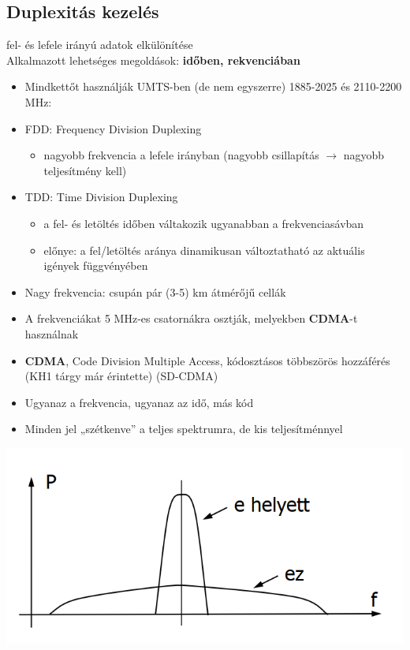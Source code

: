 \documentclass[10pt,a4paper]{article}
\begin{document}
\subsection{Duplexitás kezelés}
fel- és lefele irányú adatok elkülönítése\\
Alkalmazott lehetséges megoldások: \textbf{időben, rekvenciában}
\begin{itemize}
	\item  Mindkettőt használják UMTS-ben (de nem egyszerre) 1885-2025 és 2110-2200 MHz:
	\item FDD: Frequency Division Duplexing
	\begin{itemize}
	\item nagyobb frekvencia a lefele irányban (nagyobb csillapítás $\rightarrow$
	nagyobb teljesítmény kell)
	\end{itemize}
	\item  TDD: Time Division Duplexing
	\begin{itemize}
	\item a fel- és letöltés időben váltakozik ugyanabban a frekvenciasávban
	\item előnye: a fel/letöltés aránya dinamikusan változtatható az aktuális
	igények függvényében
	\end{itemize}
\item Nagy frekvencia: csupán pár (3-5) km átmérőjű cellák
\item  A frekvenciákat 5 MHz-es csatornákra osztják, melyekben \textbf{CDMA}-t
használnak
\item \textbf{CDMA}, Code Division Multiple Access, kódosztásos többszörös
hozzáférés (KH1 tárgy már érintette) (SD-CDMA)
\item Ugyanaz a frekvencia, ugyanaz az idő, más kód
\item Minden jel „szétkenve” a teljes spektrumra, de kis teljesítménnyel
\end{itemize}
\begin{center}
	\includegraphics[width=0.7\linewidth]{src/CDMA}
\end{center}
\end{document}

